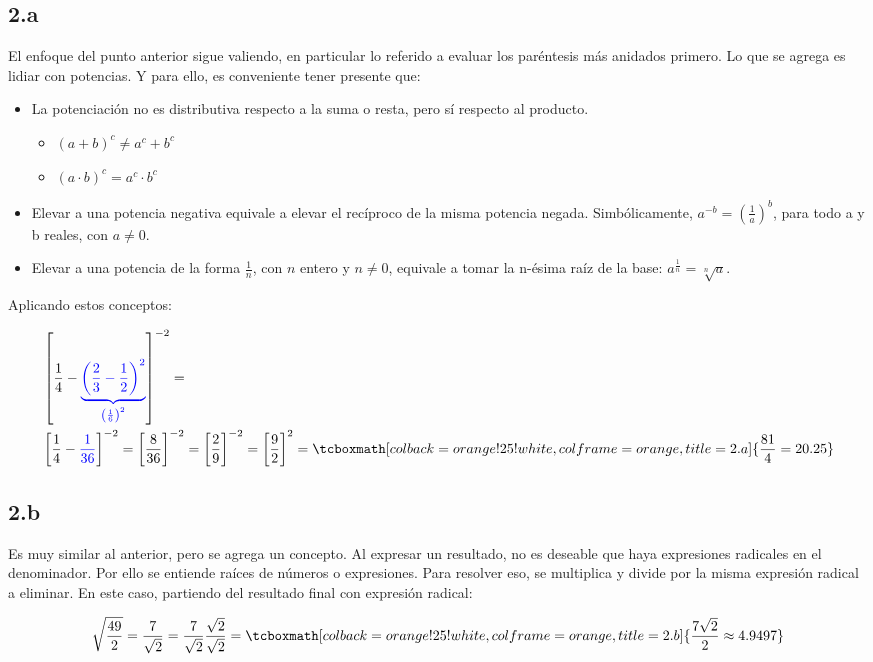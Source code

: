 \documentclass{article}
\begin{document}
\subsection*{2.a}
\label{subsec:2.a}

El enfoque del punto anterior sigue valiendo, en particular lo referido a evaluar los paréntesis más anidados primero. Lo que se agrega es lidiar con potencias. Y para ello, es conveniente tener presente que:

\begin{itemize}
\item La potenciación no es distributiva respecto a la suma o resta, pero sí respecto al producto.
\begin{itemize}
\renewcommand{\labelitemii}{$\diamond$}
\item $\left(a + b\right)^c \neq a^c + b^c$
\item $\left(a \cdot b\right)^c = a^c \cdot b^c$
\end{itemize}
\item Elevar a una potencia negativa equivale a elevar el recíproco de la misma potencia negada. Simbólicamente, $a^{-b} = \left( \frac{1}{a} \right)^b$, para todo a y b reales, con $a \neq 0$.
\item Elevar a una potencia de la forma $\frac{1}{n}$, con $n$ entero y $n \neq 0$, equivale a tomar la n-ésima raíz de la base: $a^{\frac{1}{n}} = \sqrt[n]{a}$.
\end{itemize}

Aplicando estos conceptos:

\begin{subequations}
\begin{align}
&\left[ \frac{1}{4} - \textcolor{blue}{ \underbrace{ \left( \frac{2}{3} - \frac{1}{2} \right)^2 }_{\left( \frac{1}{6} \right)^2 }} \right]^{-2} = \\
&\left[ \frac{1}{4} - \textcolor{blue}{ \frac{1}{36} } \right]^{-2} = \left[ \frac{8}{36} \right]^{-2} = \left[ \frac{2}{9} \right]^{-2} = \left[ \frac{9}{2} \right]^2 = \tcboxmath[colback=orange!25!white,colframe=orange, title=2.a] { \frac{81}{4} = 20.25 }
\end{align}
\end{subequations}

\subsection*{2.b}
\label{subsec:2.b}

Es muy similar al anterior, pero se agrega un concepto. Al expresar un resultado, no es deseable que haya expresiones radicales en el denominador. Por ello se entiende raíces de números o expresiones. Para resolver eso, se multiplica y divide por la misma expresión radical a eliminar. En este caso, partiendo del resultado final con expresión radical:

\begin{equation}
\sqrt{\frac{49}{2}} = \frac{7}{\sqrt{2}} = \frac{7}{\sqrt{2}} \frac{\sqrt{2}}{\sqrt{2}} = \tcboxmath[colback=orange!25!white,colframe=orange, title=2.b] { \frac{7 \sqrt{2}}{2} \approx 4.9497 }
\end{equation}
\end{document}

